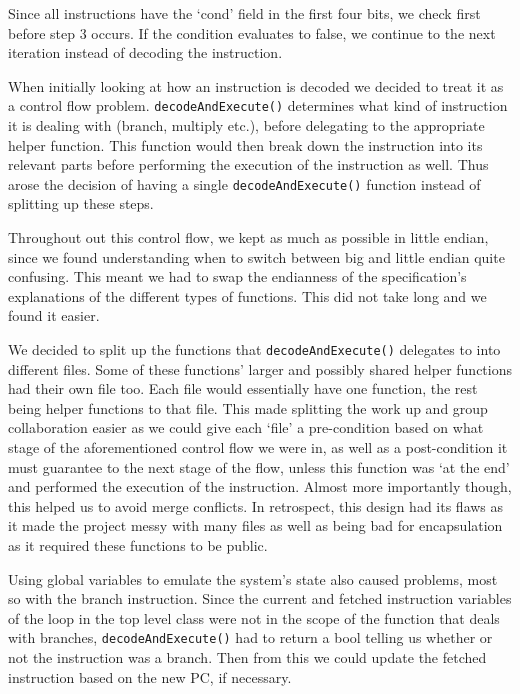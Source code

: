 \documentclass[a4paper]{article}
\begin{document}
Since all instructions have the ‘cond’ field in the first four bits, we check first before step 3 occurs. If the condition evaluates to false, we continue to the next iteration instead of decoding the instruction.

When initially looking at how an instruction is decoded we decided to treat it as a control flow problem. \texttt{decodeAndExecute()} determines what kind of instruction it is dealing with (branch, multiply etc.), before delegating to the appropriate helper function. This function would then break down the instruction into its relevant parts before performing the execution of the instruction as well. Thus arose the decision of having a single \texttt{decodeAndExecute()} function instead of splitting up these steps. 

Throughout out this control flow, we kept as much as possible in little endian, since we found understanding when to switch between big and little endian quite confusing. This meant we had to swap the endianness of the specification’s explanations of the different types of functions. This did not take long and we found it easier.

We decided to split up the functions that \texttt{decodeAndExecute()} delegates to into different files. Some of these functions’ larger and possibly shared helper functions had their own file too. Each file would essentially have one function, the rest being helper functions to that file. This made splitting the work up and group collaboration easier as we could give each ‘file’ a pre-condition based on what stage of the aforementioned control flow we were in, as well as a post-condition it must guarantee to the next stage of the flow, unless this function was ‘at the end’ and performed the execution of the instruction. Almost more importantly though, this helped us to avoid merge conflicts. In retrospect, this design had its flaws as it made the project messy with many files as well as being bad for encapsulation as it required these functions to be public.

Using global variables to emulate the system’s state also caused problems, most so with the branch instruction. Since the current and fetched instruction variables of the loop in the top level class were not in the scope of the function that deals with branches, \texttt{decodeAndExecute()} had to return a bool telling us whether or not the instruction was a branch.  Then from this we could update the fetched instruction based on the new PC, if necessary.
\end{document}
